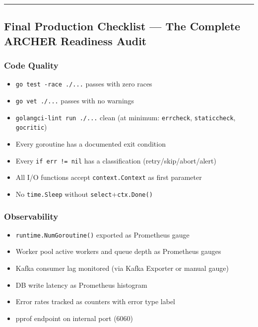 \documentclass[
]{article}
\providecommand{\tightlist}{%
  \setlength{\itemsep}{0pt}\setlength{\parskip}{0pt}}
\begin{document}
\begin{center}\rule{0.5\linewidth}{0.5pt}\end{center}

\hypertarget{final-production-checklist-the-complete-archer-readiness-audit}{%
\subsection{Final Production Checklist --- The Complete ARCHER Readiness
Audit}\label{final-production-checklist-the-complete-archer-readiness-audit}}

\hypertarget{code-quality}{%
\subsubsection{Code Quality}\label{code-quality}}

\begin{itemize}
\tightlist
\item[$\square$]
  \texttt{go\ test\ -race\ ./...} passes with zero races
\item[$\square$]
  \texttt{go\ vet\ ./...} passes with no warnings
\item[$\square$]
  \texttt{golangci-lint\ run\ ./...} clean (at minimum:
  \texttt{errcheck}, \texttt{staticcheck}, \texttt{gocritic})
\item[$\square$]
  Every goroutine has a documented exit condition
\item[$\square$]
  Every \texttt{if\ err\ !=\ nil} has a classification
  (retry/skip/abort/alert)
\item[$\square$]
  All I/O functions accept \texttt{context.Context} as first parameter
\item[$\square$]
  No \texttt{time.Sleep} without \texttt{select}+\texttt{ctx.Done()}
\end{itemize}

\hypertarget{observability}{%
\subsubsection{Observability}\label{observability}}

\begin{itemize}
\tightlist
\item[$\square$]
  \texttt{runtime.NumGoroutine()} exported as Prometheus gauge
\item[$\square$]
  Worker pool active workers and queue depth as Prometheus gauges
\item[$\square$]
  Kafka consumer lag monitored (via Kafka Exporter or manual gauge)
\item[$\square$]
  DB write latency as Prometheus histogram
\item[$\square$]
  Error rates tracked as counters with error type label
\item[$\square$]
  pprof endpoint on internal port (6060)
\end{itemize}
\end{document}
